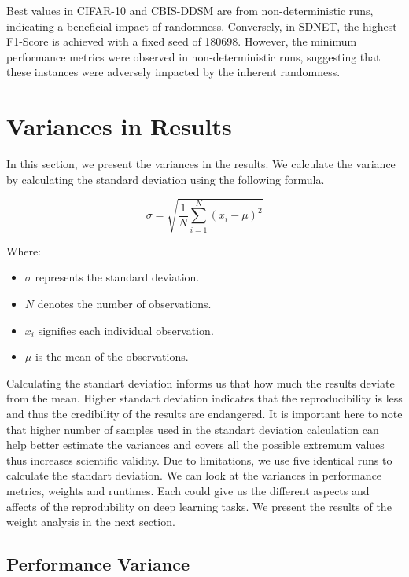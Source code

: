Best values in CIFAR-10 and CBIS-DDSM are from non-deterministic runs, indicating a beneficial impact of randomness. Conversely, in SDNET, the highest F1-Score is achieved with a fixed seed of 180698. However, the minimum performance metrics were observed in non-deterministic runs, suggesting that these instances were adversely impacted by the inherent randomness.

\section{Variances in Results}

In this section, we present the variances in the results. We calculate the variance by calculating the standard deviation using the 
following formula. 

\begin{equation}
  \sigma = \sqrt{\frac{1}{N} \sum_{i=1}^{N} (x_i - \mu)^2}
  \end{equation}
  
  Where:
  \begin{itemize}
      \item \( \sigma \) represents the standard deviation.
      \item \( N \) denotes the number of observations.
      \item \( x_i \) signifies each individual observation.
      \item \( \mu \) is the mean of the observations.
  \end{itemize}

Calculating the standart deviation informs us that how much the results deviate from the mean. Higher 
standart deviation indicates that the reproducibility is less and thus the credibility of the results are endangered. It is important here to note that
higher number of samples used in the standart deviation calculation can help better estimate the variances and covers all the possible extremum values thus increases scientific validity. 
Due to limitations, we use five identical runs to calculate the standart deviation. We can look at the variances
in performance metrics, weights and runtimes. Each could give us the different aspects and affects of the reprodubility on deep learning tasks. We present the results of the weight analysis in the next section.


\subsection{Performance Variance}

